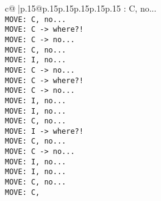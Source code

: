 \documentclass{article}
\begin{document}
{\begin{supertabular}{c@{$\;$}|p{.15\linewidth}@{}p{.15\linewidth}p{.15\linewidth}p{.15\linewidth}p{.15\linewidth}p{.15\linewidth}}
{{{: C, no...\\ \tt  MOVE: C, no...\\ \tt  MOVE: C -> where?!\\ \tt  MOVE: C -> no...\\ \tt  MOVE: C, no...\\ \tt  MOVE: I, no...\\ \tt  MOVE: C -> no...\\ \tt  MOVE: C -> where?!\\ \tt  MOVE: C -> no...\\ \tt  MOVE: I, no...\\ \tt  MOVE: I, no...\\ \tt  MOVE: C, no...\\ \tt  MOVE: I -> where?!\\ \tt  MOVE: C, no...\\ \tt  MOVE: C -> no...\\ \tt  MOVE: I, no...\\ \tt  MOVE: I, no...\\ \tt  MOVE: C, no...\\ \tt  MOVE: C, }}}
\end{supertabular}}
\end{document}
